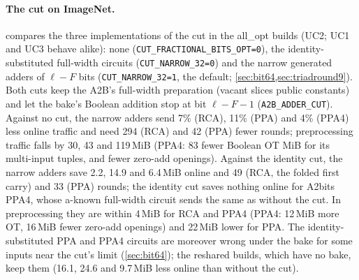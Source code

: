 \documentclass[10pt,a4paper]{article}
\newcommand{\flag}[1]{\nolinkurl{#1}}
\begin{document}
\paragraph{The cut on ImageNet.}  compares the three implementations of the cut in the all\_opt
builds (UC2; UC1 and UC3 behave alike): none (\flag{CUT_FRACTIONAL_BITS_OPT=0}), the identity-substituted full-width
circuits (\flag{CUT_NARROW_32=0}) and the narrow generated adders of $\ell - F$ bits (\flag{CUT_NARROW_32=1}, the
default; \cref{sec:bit64,sec:triadround9}). Both cuts keep the A2B's full-width preparation (vacant slices public
constants) and let the bake's Boolean addition stop at bit $\ell - F - 1$ (\flag{A2B_ADDER_CUT}). Against no cut, the
narrow adders send 7\% (RCA), 11\% (PPA) and 4\% (PPA4) less online traffic and need 294 (RCA) and 42 (PPA) fewer
rounds; preprocessing traffic falls by 30, 43 and 119\,MiB (PPA4: 83 fewer Boolean OT MiB for its multi-input tuples,
and fewer zero-add openings). Against the identity cut, the narrow adders save 2.2, 14.9 and 6.4\,MiB online and 49
(RCA, the folded first carry) and 33 (PPA) rounds; the identity cut saves nothing online for A2bits PPA4, whose
a-known full-width circuit sends the same as without the cut. In preprocessing they are within 4\,MiB for RCA and PPA4
(PPA4: 12\,MiB more OT, 16\,MiB fewer zero-add openings) and 22\,MiB lower for PPA. The identity-substituted PPA and
PPA4 circuits are moreover wrong under the bake for some inputs near the cut's limit (\cref{sec:bit64}); the reshared
builds, which have no bake, keep them (16.1, 24.6 and 9.7\,MiB less online than without the cut).
\end{document}
